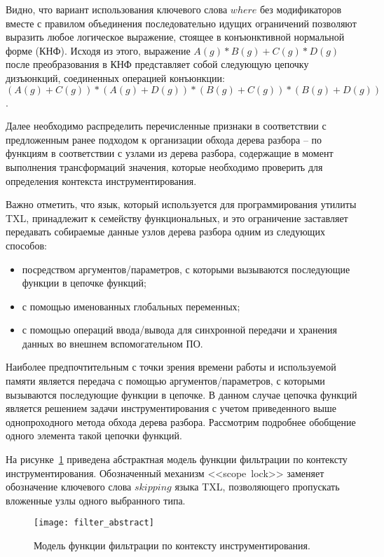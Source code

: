 Видно, что вариант использования ключевого слова $where$ без модификаторов вместе с правилом объединения последовательно идущих ограничений позволяют выразить любое логическое выражение, стоящее в конъюнктивной нормальной форме (КНФ).
Исходя из этого, выражение $A(g) * B(g) + C(g) * D(g)$ после преобразования в КНФ представляет собой следующую цепочку дизъюнкций, соединенных операцией конъюнкции: $(A(g) + C(g)) * (A(g) + D(g)) * (B(g) + C(g)) * (B(g) + D(g))$.

Далее необходимо распределить перечисленные признаки в соответствии с предложенным ранее подходом к организации обхода дерева разбора -- по функциям в соответствии с узлами из дерева разбора, содержащие в момент выполнения трансформаций значения, которые необходимо проверить для определения контекста инструментирования.

Важно отметить, что язык, который используется для программирования утилиты TXL, принадлежит к семейству функциональных, и это ограничение заставляет передавать собираемые данные узлов дерева разбора одним из следующих способов:
\begin{itemize}[noitemsep]
  \item посредством аргументов/параметров, с которыми вызываются последующие функции в цепочке функций;
  \item с помощью именованных глобальных переменных;
  \item с помощью операций ввода/вывода для синхронной передачи и хранения данных во внешнем вспомогательном ПО.
\end{itemize}

Наиболее предпочтительным с точки зрения времени работы и используемой памяти является передача с помощью аргументов/параметров, с которыми вызываются последующие функции в цепочке.
В данном случае цепочка функций является решением задачи инструментирования с учетом приведенного выше однопроходного метода обхода дерева разбора.
Рассмотрим подробнее обобщение одного элемента такой цепочки функций.

На рисунке~\ref{fig:filter_abstract} приведена абстрактная модель функции фильтрации по контексту инструментирования.
Обозначенный механизм <<scope~lock>> заменяет обозначение ключевого слова $skipping$ языка TXL, позволяющего пропускать вложенные узлы одного выбранного типа.

\begin{figure}[!h]
	\centering
	\texttt{[image: filter\_abstract]}
	\caption{Модель функции фильтрации по контексту инструментирования.}
	\label{fig:filter_abstract}
\end{figure}


